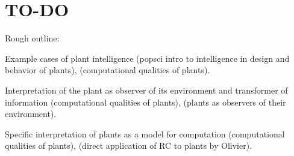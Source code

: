\section{TO-DO}

Rough outline:

Example cases of plant intelligence \cite{mancuso_revolutionary_2018} (popsci intro to intelligence in design and behavior of plants), \cite{stepney_computers_2018} (computational qualities of plants).

Interpretation of the plant as observer of its environment and transformer of information
\cite{stepney_computers_2018} (computational qualities of plants), \cite{moulia_fluctuations_2021} (plants as observers of their environment).

Specific interpretation of plants as a model for computation \cite{stepney_computers_2018} (computational qualities of plants), \cite{pieters_plants_2021} (direct application of RC to plants by Olivier).
